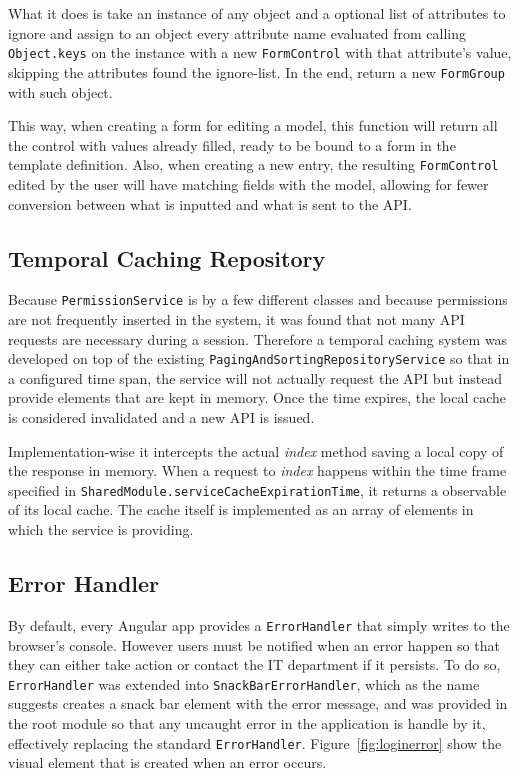 What it does is take an instance of any object and a optional list of attributes to ignore and assign to an object every attribute name evaluated from calling \texttt{Object.keys} on the instance with a new \texttt{FormControl} with that attribute's value, skipping the attributes found the ignore-list. In the end, return a new \texttt{FormGroup} with such object.

This way, when creating a form for editing a model, this function will return all the control with values already filled, ready to be bound to a form in the template definition. Also, when creating a new entry, the resulting \texttt{FormControl} edited by the user will have matching fields with the model, allowing for fewer conversion between what is inputted and what is sent to the \gls{API}.

\subsection{Temporal Caching Repository}
Because \texttt{PermissionService} is by a few different classes and because permissions are not frequently inserted in the system, it was found that not many \gls{API} requests are necessary during a session. Therefore a temporal caching system was developed on top of the existing \texttt{PagingAndSortingRepositoryService} so that in a configured time span, the service will not actually request the \gls{API} but instead provide elements that are kept in memory. Once the time expires, the local cache is considered invalidated and a new \gls{API} is issued.

Implementation-wise it intercepts the actual \textit{index} method saving a local copy of the response in memory. When a request to \textit{index} happens within the time frame specified in \texttt{SharedModule.serviceCacheExpirationTime}, it returns a observable of its local cache. The cache itself is implemented as an array of elements in which the service is providing.

\subsection{Error Handler}
By default, every Angular app provides a \texttt{ErrorHandler} that simply writes to the browser's console. However users must be notified when an error happen so that they can either take action or contact the IT department if it persists. To do so, \texttt{ErrorHandler} was extended into \texttt{SnackBarErrorHandler}, which as the name suggests creates a snack bar element with the error message, and was provided in the root module so that any uncaught error in the application is handle by it, effectively replacing the standard \texttt{ErrorHandler}. Figure~\ref{fig:loginerror} show the visual element that is created when an error occurs.

